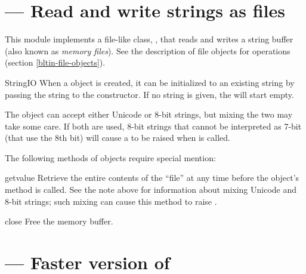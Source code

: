 \section{ ---
         Read and write strings as files}



This module implements a file-like class, ,
that reads and writes a string buffer (also known as \emph{memory
files}).  See the description of file objects for operations (section
\ref{bltin-file-objects}).

\begin{classdesc}{StringIO}{}
When a  object is created, it can be initialized
to an existing string by passing the string to the constructor.
If no string is given, the  will start empty.

The  object can accept either Unicode or 8-bit
strings, but mixing the two may take some care.  If both are used,
8-bit strings that cannot be interpreted as 7-bit \ASCII{} (that
use the 8th bit) will cause a  to be raised
when  is called.
\end{classdesc}

The following methods of  objects require special
mention:

\begin{methoddesc}{getvalue}{}
Retrieve the entire contents of the ``file'' at any time before the
 object's  method is called.  See the
note above for information about mixing Unicode and 8-bit strings;
such mixing can cause this method to raise .
\end{methoddesc}

\begin{methoddesc}{close}{}
Free the memory buffer.
\end{methoddesc}


\section{ ---
         Faster version of }


